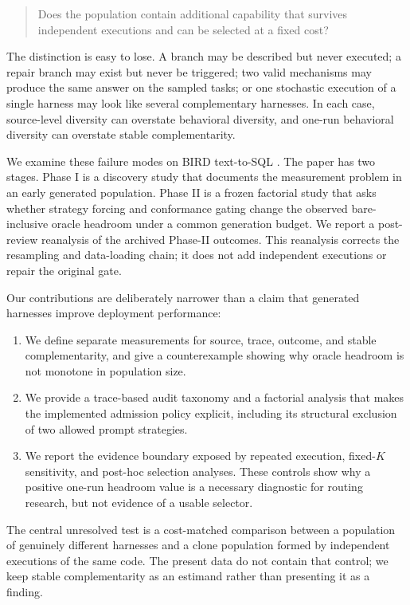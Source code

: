 \documentclass{article}
\providecommand{\tightlist}{\setlength{\itemsep}{0pt}\setlength{\parskip}{0pt}}
\begin{document}
\begin{quote}
Does the population contain additional capability that survives independent
executions and can be selected at a fixed cost?
\end{quote}

The distinction is easy to lose. A branch may be described but never executed;
a repair branch may exist but never be triggered; two valid mechanisms may
produce the same answer on the sampled tasks; or one stochastic execution of a
single harness may look like several complementary harnesses. In each case,
source-level diversity can overstate behavioral diversity, and one-run
behavioral diversity can overstate stable complementarity.

We examine these failure modes on BIRD text-to-SQL \citep{bird2021}. The paper
has two stages. Phase I is a discovery study that documents the measurement
problem in an early generated population. Phase II is a frozen factorial study
that asks whether strategy forcing and conformance gating change the observed
bare-inclusive oracle headroom under a common generation budget. We report a
post-review reanalysis of the archived Phase-II outcomes. This reanalysis
corrects the resampling and data-loading chain; it does not add independent
executions or repair the original gate.

Our contributions are deliberately narrower than a claim that generated
harnesses improve deployment performance:
\begin{enumerate}
\tightlist
\item We define separate measurements for source, trace, outcome, and stable
complementarity, and give a counterexample showing why oracle headroom is not
monotone in population size.
\item We provide a trace-based audit taxonomy and a factorial analysis that
makes the implemented admission policy explicit, including its structural
exclusion of two allowed prompt strategies.
\item We report the evidence boundary exposed by repeated execution,
fixed-$K$ sensitivity, and post-hoc selection analyses. These controls show
why a positive one-run headroom value is a necessary diagnostic for routing
research, but not evidence of a usable selector.
\end{enumerate}

The central unresolved test is a cost-matched comparison between a population
of genuinely different harnesses and a clone population formed by independent
executions of the same code. The present data do not contain that control; we
keep stable complementarity as an estimand rather than presenting it as a
finding.
\end{document}
